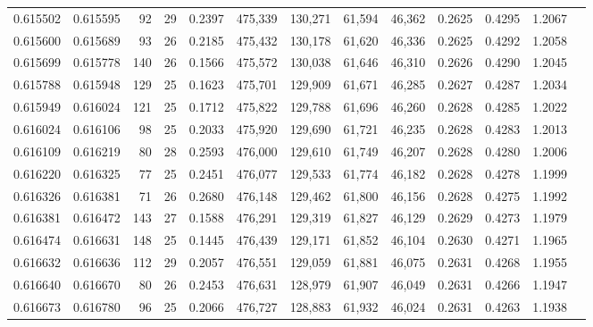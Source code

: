 \begin{tabular}{rrrrrrrrrrrrr}
0.615502 & 0.615595 &    92 &  29 &                                     0.2397 & 475,339 & 130,271 &  61,594 &  46,362 & 0.2625 & 0.4295 & 1.2067 \\
0.615600 & 0.615689 &    93 &  26 &                                     0.2185 & 475,432 & 130,178 &  61,620 &  46,336 & 0.2625 & 0.4292 & 1.2058 \\
0.615699 & 0.615778 &   140 &  26 &                                     0.1566 & 475,572 & 130,038 &  61,646 &  46,310 & 0.2626 & 0.4290 & 1.2045 \\
0.615788 & 0.615948 &   129 &  25 &                                     0.1623 & 475,701 & 129,909 &  61,671 &  46,285 & 0.2627 & 0.4287 & 1.2034 \\
0.615949 & 0.616024 &   121 &  25 &                                     0.1712 & 475,822 & 129,788 &  61,696 &  46,260 & 0.2628 & 0.4285 & 1.2022 \\
0.616024 & 0.616106 &    98 &  25 &                                     0.2033 & 475,920 & 129,690 &  61,721 &  46,235 & 0.2628 & 0.4283 & 1.2013 \\
0.616109 & 0.616219 &    80 &  28 &                                     0.2593 & 476,000 & 129,610 &  61,749 &  46,207 & 0.2628 & 0.4280 & 1.2006 \\
0.616220 & 0.616325 &    77 &  25 &                                     0.2451 & 476,077 & 129,533 &  61,774 &  46,182 & 0.2628 & 0.4278 & 1.1999 \\
0.616326 & 0.616381 &    71 &  26 &                                     0.2680 & 476,148 & 129,462 &  61,800 &  46,156 & 0.2628 & 0.4275 & 1.1992 \\
0.616381 & 0.616472 &   143 &  27 &                                     0.1588 & 476,291 & 129,319 &  61,827 &  46,129 & 0.2629 & 0.4273 & 1.1979 \\
0.616474 & 0.616631 &   148 &  25 &                                     0.1445 & 476,439 & 129,171 &  61,852 &  46,104 & 0.2630 & 0.4271 & 1.1965 \\
0.616632 & 0.616636 &   112 &  29 &                                     0.2057 & 476,551 & 129,059 &  61,881 &  46,075 & 0.2631 & 0.4268 & 1.1955 \\
0.616640 & 0.616670 &    80 &  26 &                                     0.2453 & 476,631 & 128,979 &  61,907 &  46,049 & 0.2631 & 0.4266 & 1.1947 \\
0.616673 & 0.616780 &    96 &  25 &                                     0.2066 & 476,727 & 128,883 &  61,932 &  46,024 & 0.2631 & 0.4263 & 1.1938 \\

\end{tabular}
